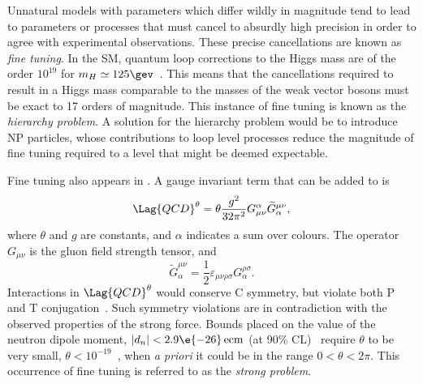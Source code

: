 Unnatural models with parameters which differ wildly in magnitude tend to
lead to parameters or processes that must cancel to absurdly
high precision in order to agree with experimental observations.
These precise cancellations are known as \emph{fine tuning}.
In the SM, quantum loop corrections to the Higgs mass are of the order $10^{19}$
for $m_H\simeq125\gev$~\cite{Chatrchyan:2012ufa,Aad:2012tfa}.
This means that the cancellations required to result in a Higgs mass comparable to the masses of
the weak vector bosons must be exact to 17 orders of magnitude.
This instance of fine tuning is known as the \emph{hierarchy problem}.
A solution for the hierarchy problem would be to introduce NP particles, whose contributions to
loop level processes reduce the magnitude of fine tuning required to a level that might be deemed
expectable.

Fine tuning also appears in \QCD.
A gauge invariant term that can be added to  is
\begin{equation}
  \Lag{QCD}^\theta = \theta\frac{g^2}{32\pi^2}
  G_{\mu\nu}^\alpha\widetilde G^{\mu\nu}_\alpha,
  \label{eq:strongcp}
\end{equation}
where $\theta$ and $g$ are constants, and $\alpha$ indicates a sum over colours.
The operator $G_{\mu\nu}$ is the gluon field strength tensor, and
\begin{equation}
  \widetilde G^{\mu\nu}_\alpha = \frac12\varepsilon_{\mu\nu\rho\sigma}G^{\rho\sigma}_\alpha.
\end{equation}
Interactions in $\Lag{QCD}^\theta$ would conserve \gls{C} symmetry, but violate both \gls{P} and
\gls{T} conjugation~\cite{Peccei:2006as}.
Such symmetry violations are in contradiction with the observed properties of the strong
force.
Bounds placed on the value of the neutron dipole moment, $|d_n| <2.9\e{-26}\,\mathrm{ecm}$
(at 90\% CL)~\cite{Baker:2006ts} require $\theta$ to be very small,
$\theta<10^{-19}$~\cite{Crewther:PQref9}, when \emph{a priori} it could be in the range
$0<\theta<2\pi$.
This occurrence of fine tuning is referred to as the \emph{strong \CP problem}.

